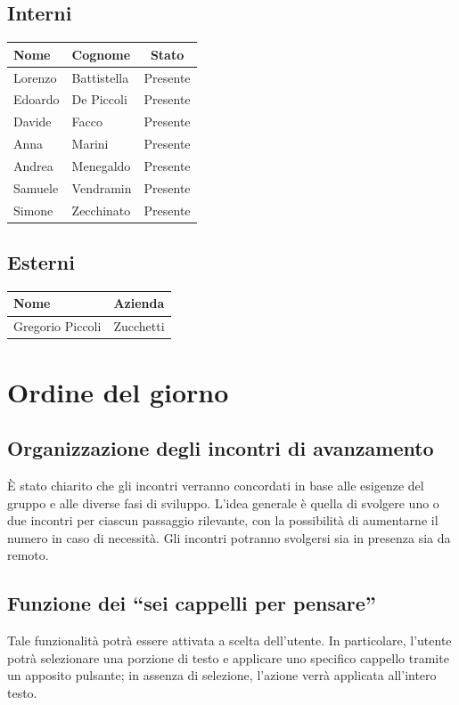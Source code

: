 \documentclass[a4paper, 10pt, colorlinks=true, linkcolor=black, urlcolor=blue, citecolor=blue, hidelinks]{article}
\begin{document}
\subsection{Interni}

\begin{center}
\begin{tabular}{|l|l|c|}
\hline
\textbf{Nome} & \textbf{Cognome} & \textbf{Stato} \\
\hline
Lorenzo & Battistella & Presente \\
Edoardo & De Piccoli & Presente \\
Davide & Facco & Presente \\
Anna & Marini & Presente \\
Andrea & Menegaldo & Presente \\
Samuele & Vendramin & Presente \\
Simone & Zecchinato & Presente \\
\hline
\end{tabular}
\end{center}

\subsection{Esterni}

\begin{center}
\begin{tabular}{|l|l|}
\hline
\textbf{Nome} & \textbf{Azienda} \\
\hline
Gregorio Piccoli & Zucchetti \\
\hline
\end{tabular}
\end{center}

\section{Ordine del giorno}

\subsection{Organizzazione degli incontri di avanzamento}
È stato chiarito che gli incontri verranno concordati in base alle esigenze del gruppo e alle diverse fasi di sviluppo. L'idea generale è quella di svolgere uno o due incontri per ciascun passaggio rilevante, con la possibilità di aumentarne il numero in caso di necessità. Gli incontri potranno svolgersi sia in presenza sia da remoto.

\subsection{Funzione dei ``sei cappelli per pensare''}
Tale funzionalità potrà essere attivata a scelta dell'utente. In particolare, l'utente potrà selezionare una porzione di testo e applicare uno specifico cappello tramite un apposito pulsante; in assenza di selezione, l'azione verrà applicata all'intero testo.
\end{document}
